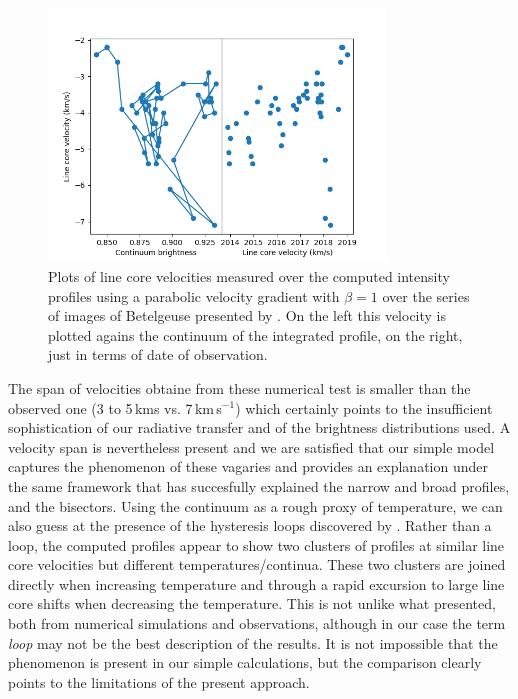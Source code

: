 \documentclass{/Users/art2/TeX/aanda/aa}
\def\kms {km\,s$^{-1}$}
\begin{document}
\begin{figure}
   \includegraphics[width=0.8\textwidth]{Histeresis.png}
   \caption{Plots of line core velocities measured over the computed intensity profiles using a parabolic velocity gradient with $\beta=1$ over the 
   series of images of Betelgeuse presented by \cite{auriere_discovery_2016} \cite{lopez_ariste_height_2023}. On the left this velocity is plotted 
   agains the continuum of the integrated profile, on the right, just in terms of date of observation. }
   \label{hysteresis}
   \end{figure}

The span of velocities obtaine from these numerical test is smaller than the observed one (3 to 5\,kms vs. 7\,\kms) which certainly points to the insufficient 
sophistication of our radiative transfer and of the brightness distributions used. A velocity span is nevertheless present and we are satisfied that 
our simple model captures the phenomenon of these vagaries and provides an explanation under the same framework that has succesfully explained the narrow 
and broad profiles, and the bisectors. Using the continuum as a rough proxy of temperature, we can also guess at the presence of the hysteresis loops 
discovered by \cite{kravchenko_tomography_2018}. Rather than a loop, the computed profiles appear to show two clusters of profiles at similar line core 
velocities but different temperatures/continua. These two clusters are joined directly when increasing temperature and through a rapid excursion to 
large line core shifts when decreasing the temperature. This is not unlike what \cite{kravchenko_tomography_2019} presented, both from numerical simulations
and observations, although in our case the term \textit{loop} may not be the best description of the results. It is not impossible that the phenomenon 
is present in our simple calculations, but the comparison clearly points to the limitations of the present approach.
\end{document}
